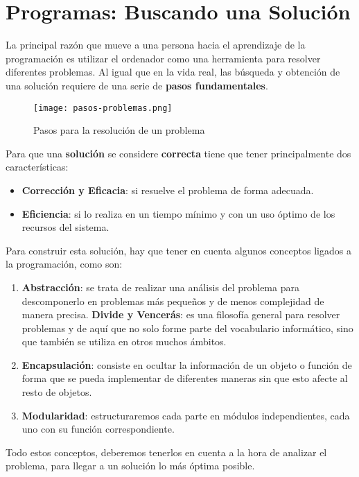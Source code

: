 \section{Programas: Buscando una Solución}
La principal razón que mueve  a una persona hacia el aprendizaje de la programación es utilizar el ordenador como una herramienta para resolver diferentes problemas. Al igual que en la vida real, las búsqueda y obtención de una solución requiere de una serie de \textbf{pasos fundamentales}.

\begin{figure}[H]
    \centering
    \texttt{[image: pasos-problemas.png]}
    \caption{Pasos para la resolución de un problema}
\end{figure}

Para que una \textbf{solución} se considere \textbf{correcta} tiene que tener principalmente dos características:

\begin{itemize}
    \item \textbf{Corrección y Eficacia}: si resuelve el problema de forma adecuada.
    \item \textbf{Eficiencia}: si lo realiza en un tiempo mínimo y con un uso óptimo de los recursos del sistema.
\end{itemize}

Para construir esta solución, hay que tener en cuenta algunos conceptos ligados a la programación, como son:

\begin{enumerate}
    \item \textbf{Abstracción}: se trata de realizar una análisis del problema para descomponerlo en problemas más pequeños y de menos complejidad de manera precisa. \textbf{Divide y Vencerás}: es una filosofía general para resolver problemas y de aquí que no solo forme parte del vocabulario informático, sino que también se utiliza en otros muchos ámbitos.

    \item \textbf{Encapsulación}: consiste en ocultar la información de un objeto o función de forma que se pueda implementar de diferentes maneras sin que esto afecte al resto de objetos.

    \item \textbf{Modularidad}: estructuraremos cada parte en módulos independientes, cada uno con su función correspondiente.
\end{enumerate}

Todo estos conceptos, deberemos tenerlos en cuenta a la hora de analizar el problema, para llegar a un solución lo más óptima posible.

